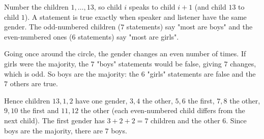 Number the children $1,\dots,13$, so child $i$ speaks to child $i+1$ (and child $13$ to child $1$). A statement is true exactly when speaker and listener have the same gender. The odd-numbered children ($7$ statements) say "most are boys" and the even-numbered ones ($6$ statements) say "most are girls".

Going once around the circle, the gender changes an even number of times. If girls were the majority, the $7$ "boys" statements would be false, giving $7$ changes, which is odd. So boys are the majority: the $6$ "girls" statements are false and the $7$ others are true.

Hence children $13,1,2$ have one gender, $3,4$ the other, $5,6$ the first, $7,8$ the other, $9,10$ the first and $11,12$ the other (each even-numbered child differs from the next child). The first gender has $3+2+2=7$ children and the other $6$. Since boys are the majority, there are $\boxed{7}$ boys.
